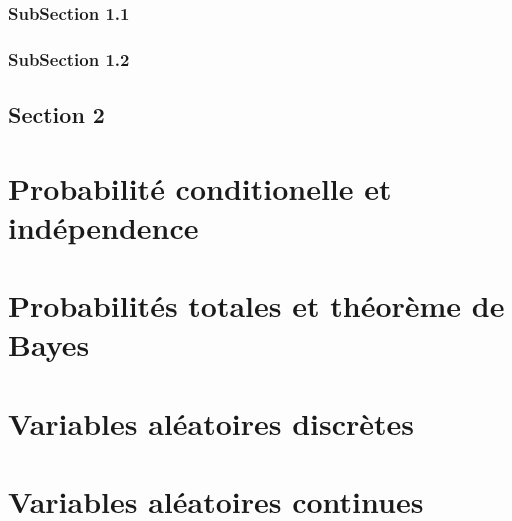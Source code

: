 \documentclass[letterpaper,10pt,english]{jupyterBook}
\begin{document}
\subsection{Sub\sphinxhyphen{}Section 1.1}
\label{\detokenize{Probabilit_xe9/arrangements_et_combinaisons:sub-section-1-1}}

\subsection{Sub\sphinxhyphen{}Section 1.2}
\label{\detokenize{Probabilit_xe9/arrangements_et_combinaisons:sub-section-1-2}}

\section{Section 2}
\label{\detokenize{Probabilit_xe9/arrangements_et_combinaisons:section-2}}
\sphinxstepscope


\chapter{Probabilité conditionelle et indépendence}
\label{\detokenize{Probabilit_xe9/probabilite_conditionnelle_independance:probabilite-conditionelle-et-independence}}\label{\detokenize{Probabilit_xe9/probabilite_conditionnelle_independance::doc}}
\sphinxstepscope


\chapter{Probabilités totales et théorème de Bayes}
\label{\detokenize{Probabilit_xe9/probabilites_totales_et_theoreme_de_bayes:probabilites-totales-et-theoreme-de-bayes}}\label{\detokenize{Probabilit_xe9/probabilites_totales_et_theoreme_de_bayes::doc}}
\sphinxstepscope


\chapter{Variables aléatoires discrètes}
\label{\detokenize{Probabilit_xe9/variables_aleatoires_discretes:variables-aleatoires-discretes}}\label{\detokenize{Probabilit_xe9/variables_aleatoires_discretes::doc}}
\sphinxstepscope


\chapter{Variables aléatoires continues}
\label{\detokenize{Probabilit_xe9/variables_aleatoires_continues:variables-aleatoires-continues}}\label{\detokenize{Probabilit_xe9/variables_aleatoires_continues::doc}}
\sphinxstepscope
\end{document}
